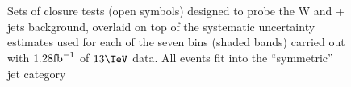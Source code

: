 

\begin{figure}[h!]
  \begin{center}
     ~~
     \\
     ~~
     \\
    \caption{Sets of closure tests (open symbols) designed to probe
      the W and \ttbar + jets background, overlaid on top of
      the systematic uncertainty estimates used for each of the seven
      \scalht bins (shaded bands) carried out with $1.28\text{fb}^{-1}$ of
      $13\tev$ data. All events fit into the ``symmetric'' jet
      category}
    \label{fig:ttWclosureDataSym}
  \end{center} 
\end{figure}

